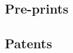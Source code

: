 \documentclass[]{mbcv}
\begin{document}
\begin{refsection}
\nocite{*}
\section{Pre-prints}
\vspace*{10pt}
\printbibliography[heading=none]
\end{refsection}

\begin{refsection}
\nocite{*}
\section{Patents}
\vspace*{10pt}
\printbibliography[heading=none]
\end{refsection}

\end{document}
